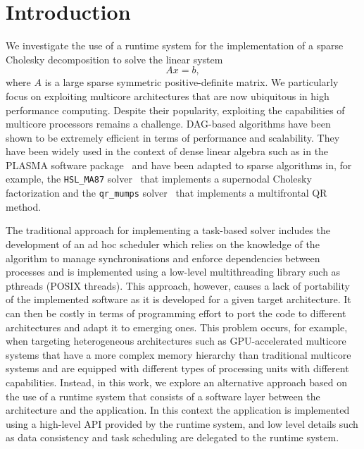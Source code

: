 \documentclass{article}
\newcommand{\lsection}[1]{\section{#1} \setcounter{equation}{0} \setcounter{figure}{0} \setcounter{table}{0} \label{#1}}
\begin{document}
\newpage
\setcounter{page}{1}


\lsection{Introduction} \label{sec:introduction} 

We investigate the use of a runtime system for the implementation of a
sparse Cholesky decomposition to solve the linear system
\begin{equation}\label{eq:linear-system}
  Ax = b,
\end{equation}
where $A$ is a large sparse symmetric positive-definite matrix. We
particularly focus on exploiting multicore architectures that are now
ubiquitous in high performance computing.  Despite their popularity,
exploiting the capabilities of multicore processors remains a
challenge.  DAG-based algorithms have been shown to be extremely
efficient in terms of performance and scalability. They have been
widely used in the context of dense linear algebra such as in the
PLASMA software package~\cite{a.d.d.h.ea:09} and have been adapted to
sparse algorithms in, for example, the \texttt{HSL\_MA87}
solver~\cite{h.r.s:10} that implements a supernodal Cholesky
factorization and the \texttt{qr\_mumps} solver~\cite{b:13} that
implements a multifrontal QR method.

The traditional approach for implementing a task-based solver includes
the development of an ad hoc scheduler which relies on the knowledge
of the algorithm to manage synchronisations and enforce dependencies
between processes and is implemented using a low-level multithreading
library such as pthreads (POSIX threads). This approach, however,
causes a lack of portability of the implemented software as it is
developed for a given target architecture. It can then be costly in
terms of programming effort to port the code to different
architectures and adapt it to emerging ones. This problem occurs, for
example, when targeting heterogeneous architectures such as
GPU-accelerated multicore systems that have a more complex memory
hierarchy than traditional multicore systems and are equipped with
different types of processing units with different
capabilities. Instead, in this work, we explore an alternative
approach based on the use of a runtime system that consists of a
software layer between the architecture and the application. In this
context the application is implemented using a high-level API provided
by the runtime system, and low level details such as data consistency
and task scheduling are delegated to the runtime system. 
\end{document}
